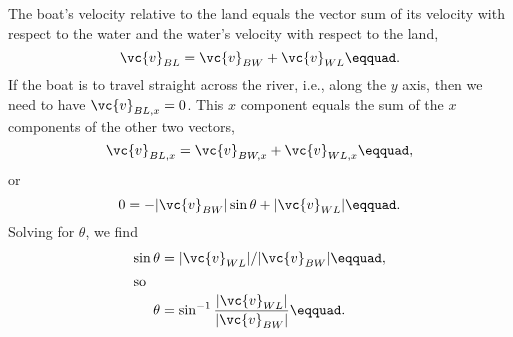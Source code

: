 The boat's velocity relative to the land equals
the vector sum of its velocity with respect to the water and
the water's velocity with respect to the land,
\begin{equation*}
            \vc{v}_{BL} =  \vc{v}_{BW}+  \vc{v}_{WL}\eqquad.
\end{equation*}
If the boat is to travel straight across the river, i.e.,
along the $y$ axis, then we need to have $\vc{v}_{BL,x}=0$. This $x$
component equals the sum of the $x$ components of the other two vectors,
\begin{equation*}
            \vc{v}_{BL,x}  =  \vc{v}_{BW,x} +  \vc{v}_{WL,x}\eqquad,
\end{equation*}
or
\begin{equation*}
            0  =  -|\vc{v}_{BW}| \sin  \theta  + |\vc{v}_{WL}|\eqquad.
\end{equation*}
Solving for $\theta $, we find
\begin{align*}
            \sin  \theta  &=  |\vc{v}_{WL}|/|\vc{v}_{BW}|\eqquad,\\
\intertext{so}
            \theta &= \sin^{-1}\frac{|\vc{v}_{WL}|}{|\vc{v}_{BW}|}\eqquad.
\end{align*}
